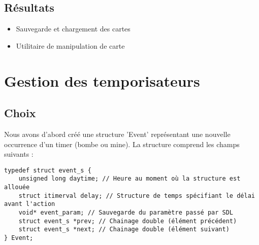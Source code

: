 \documentclass[a4paper]{article}
\newcommand{\cmark}{\ding{51}}%
\newcommand{\xmark}{\ding{55}}%
\newcommand{\done}{\rlap{$\square$}{\raisebox{2pt}{\large\hspace{1pt}\cmark}}%
\hspace{-2.5pt}}
\newcommand{\wontfix}{\rlap{$\square$}{\large\hspace{1pt}\xmark}}
\begin{document}
\subsection{Résultats}
\begin{itemize}
  \item Sauvegarde et chargement des cartes
  
  \item Utilitaire de manipulation de carte
\end{itemize}
\section{Gestion des temporisateurs}
\subsection{Choix}
Nous avons d'abord créé une structure 'Event' représentant une nouvelle occurrence d'un timer (bombe ou mine). La structure comprend les champs suivants :

\begin{verbatim}
typedef struct event_s {
    unsigned long daytime; // Heure au moment où la structure est allouée
    struct itimerval delay; // Structure de temps spécifiant le délai avant l'action
    void* event_param; // Sauvegarde du paramètre passé par SDL
    struct event_s *prev; // Chainage double (élément précédent)
    struct event_s *next; // Chainage double (élément suivant)
} Event;
\end{verbatim}
\end{document}
